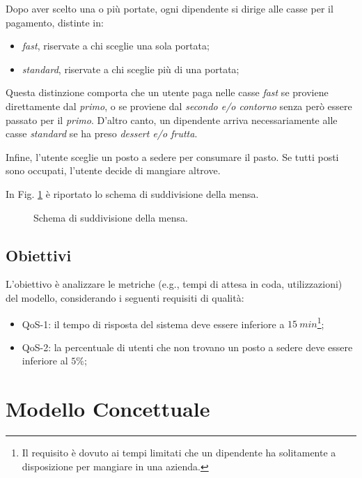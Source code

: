 \documentclass{article}
\begin{document}
Dopo aver scelto una o più portate, ogni dipendente si dirige alle casse per il pagamento, distinte in:
\begin{itemize}
\item \textit{fast}, riservate a chi sceglie una sola portata;
\item \textit{standard}, riservate a chi sceglie più di una portata;
\end{itemize}

Questa distinzione comporta che un utente paga nelle casse \textit{fast} se proviene direttamente dal \textit{primo}, o se proviene dal \textit{secondo e/o contorno} senza però essere passato per il \textit{primo}. D'altro canto, un dipendente arriva necessariamente alle casse \textit{standard} se ha preso \textit{dessert e/o frutta}.

Infine, l'utente sceglie un posto a sedere per consumare il pasto. Se tutti posti sono occupati, l'utente decide di mangiare altrove.

In Fig. \ref{fig:blocchi} è riportato lo schema di suddivisione della mensa. 

\begin{figure}[htbp]
  \centering
  
  \caption{Schema di suddivisione della mensa.}
  \label{fig:blocchi}
\end{figure}

\subsection{Obiettivi}

L'obiettivo è analizzare le metriche (e.g., tempi di attesa in coda, utilizzazioni) del modello, considerando i seguenti requisiti di qualità:
\begin{itemize}
\item QoS-1: il tempo di risposta del sistema deve essere inferiore a $15\ min$\footnote{Il requisito è dovuto ai tempi limitati che un dipendente ha solitamente a disposizione per mangiare in una azienda.};
\item QoS-2: la percentuale di utenti che non trovano un posto a sedere deve essere inferiore al $5 \%$;
\end{itemize}

\section{Modello Concettuale}\label{sec:concettuale}
\end{document}
